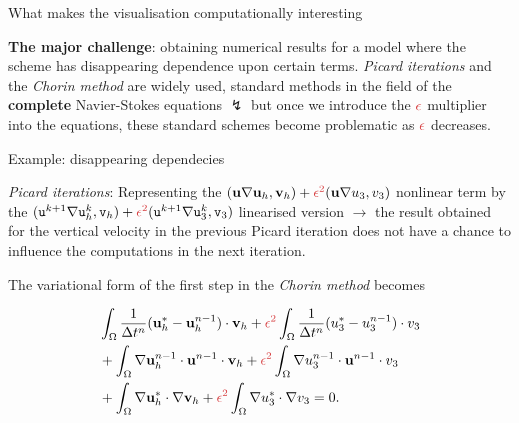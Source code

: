 \documentclass{beamer}
\begin{document}
\begin{frame}{What makes the visualisation computationally interesting}

\textbf{The major challenge}: \textcolor{mediumred-violet}{obtaining numerical results for a model where the scheme has disappearing dependence upon certain terms}. \textit{Picard iterations} and the \textit{Chorin method} are widely used, standard methods in the field of the \textbf{complete} Navier-Stokes equations $\lightning$ but once we introduce the $\textcolor{jasper}{\epsilon}$ multiplier into the equations, these standard schemes become problematic as $\textcolor{jasper}{\epsilon}$ decreases.

\end{frame}

\begin{frame}{Example: disappearing dependecies}

\textit{Picard iterations}: Representing the $(\mathbf{u} \nabla \mathbf{u}_h, \mathbf{v}_h) + \textcolor{jasper}{\epsilon^2} ( \mathbf{u} \nabla u_3, v_3)$ nonlinear term by the $( \texttt{u}^{k+1} \nabla \texttt{u}_h^k, \texttt{v}_h ) + \textcolor{jasper}{\epsilon^2} (\texttt{u}^{k+1} \nabla \texttt{u}_3^k, \texttt{v}_3 )$ linearised version $\to$ the result obtained for the vertical velocity in the previous Picard iteration does not have a chance to influence the computations in the next iteration.

The variational form of the first step in the \textit{Chorin method} becomes

\begin{equation} \nonumber
\begin{split}
& \int_\Omega \frac{1}{\Delta t^n} (\mathbf{u}_h^* - \mathbf{u}_h^{n-1}) \cdot \mathbf{v}_h + \textcolor{jasper}{\epsilon^2} \int_\Omega \frac{1}{\Delta t^n} (u_3^* - u_3^{n-1}) \cdot v_3 \\
& + \int_\Omega \nabla \mathbf{u}_h^{n-1} \cdot \mathbf{u}^{n-1} \cdot \mathbf{v}_h + \textcolor{jasper}{\epsilon^2} \int_\Omega \nabla u_3^{n-1} \cdot \mathbf{u}^{n-1} \cdot v_3 \\
& + \int_\Omega \nabla \mathbf{u}_h^* \cdot \nabla \mathbf{v}_h + \textcolor{jasper}{\epsilon^2} \int_\Omega \nabla u_3^* \cdot \nabla v_3 = 0.
\end{split}
\end{equation}

\end{frame}
\end{document}
